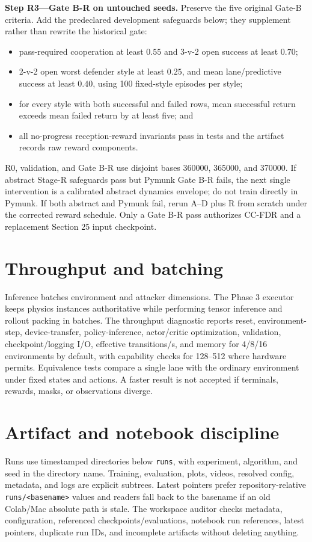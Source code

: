 \documentclass[12pt,twocolumn]{article}
\begin{document}
\textbf{Step R3---Gate B-R on untouched seeds.} Preserve the five original Gate-B criteria. Add
the predeclared development safeguards below; they supplement rather than rewrite the historical
gate:
\begin{itemize}
\item pass-required cooperation at least $0.55$ and 3-v-2 open success at least $0.70$;
\item 2-v-2 open worst defender style at least $0.25$, and mean lane/predictive success at least
$0.40$, using 100 fixed-style episodes per style;
\item for every style with both successful and failed rows, mean successful return exceeds mean
failed return by at least five; and
\item all no-progress reception-reward invariants pass in tests and the artifact records raw
reward components.
\end{itemize}
R0, validation, and Gate B-R use disjoint bases 360000, 365000, and 370000. If abstract Stage-R
safeguards pass but Pymunk
Gate B-R fails, the next single intervention is a calibrated abstract dynamics envelope; do not
train directly in Pymunk. If both abstract and Pymunk fail, rerun A--D plus R from scratch under
the corrected reward schedule. Only a Gate B-R pass authorizes CC-FDR and a replacement Section
25 input checkpoint.

\section{Throughput and batching}
Inference batches environment and attacker dimensions. The Phase 3 executor keeps physics
instances authoritative while performing tensor inference and rollout packing in batches. The
throughput diagnostic reports reset, environment-step, device-transfer, policy-inference,
actor/critic optimization, validation, checkpoint/logging I/O, effective transitions/s, and
memory for 4/8/16 environments by default, with capability
checks for 128--512 where hardware permits. Equivalence tests compare a single lane with the
ordinary environment under fixed states and actions. A faster result is not accepted if terminals,
rewards, masks, or observations diverge.

\section{Artifact and notebook discipline}
Runs use timestamped directories below \texttt{runs}, with experiment, algorithm, and seed in the
directory name. Training,
evaluation, plots, videos, resolved config, metadata, and logs are explicit subtrees. Latest
pointers prefer repository-relative \texttt{runs/<basename>} values and readers fall back to the
basename if an old Colab/Mac absolute path is stale. The workspace auditor checks metadata,
configuration, referenced checkpoints/evaluations, notebook run references, latest pointers,
duplicate run IDs, and incomplete artifacts without deleting anything.
\end{document}
